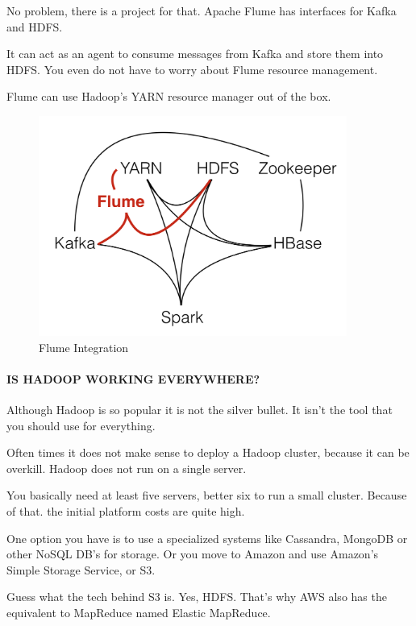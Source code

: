 \documentclass[12pt]{scrartcl} %
\begin{document}
No problem, there is a project for that. Apache Flume has interfaces for Kafka and HDFS.

It can act as an agent to consume messages from Kafka and store them into HDFS. You even do not have to worry about Flume resource management.

Flume can use Hadoop’s YARN resource manager out of the box.

\begin{figure}[htbp] 
  \centering
     \includegraphics[width=0.9\textwidth]{images/Hadoop-Ecosystem-Connections-Flume.png}
  \caption{Flume Integration}
  \label{fig:Bild1}
\end{figure}



\paragraph{IS HADOOP WORKING EVERYWHERE?}

Although Hadoop is so popular it is not the silver bullet. It isn’t the tool that you should use for everything.

Often times it does not make sense to deploy a Hadoop cluster, because it can be overkill. Hadoop does not run on a single server.

You basically need at least five servers, better six to run a small cluster. Because of that. the initial platform costs are quite high.

One option you have is to use a specialized systems like Cassandra, MongoDB or other NoSQL DB’s for storage. Or you move to Amazon and use Amazon’s Simple Storage Service, or S3.

Guess what the tech behind S3 is. Yes, HDFS. That’s why AWS also has the equivalent to MapReduce named Elastic MapReduce.
\end{document}
